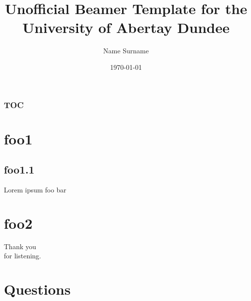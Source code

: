 \documentclass{beamer}
\author{Name Surname}
\title{Unofficial Beamer Template for the University of Abertay Dundee}
\date{\today}
\begin{document}
\begin{frame}

\titlepage
\end{frame}

\begin{frame}
	\frametitle{TOC}
	\tableofcontents
\end{frame}

\section{foo1}
\subsection{foo1.1}
\begin{frame}{Lorem ipsum}
foo bar
\end{frame}



\section{foo2}
\begin{frame}
\vfill
\begin{center}\begin{Huge}Thank you \\[10pt]
for listening.\end{Huge}\vfill
\end{center}
\vfill
\end{frame}

\section{Questions}
\center{}
\end{document}
